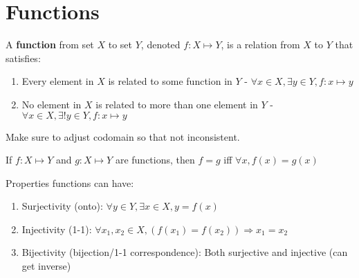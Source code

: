 \documentclass[12pt]{article}
\begin{document}
\section*{Functions}

A \textbf{function} from set $X$ to set $Y$, denoted $f\colon X \mapsto Y$, is a relation from $X$ to $Y$ that satisfies:
\begin{enumerate}
    \item Every element in $X$ is related to some function in $Y$ - $\forall x \in X, \exists y \in Y, f\colon x \mapsto y$
    \item No element in $X$ is related to more than one element in $Y$ - $\forall x \in X, \exists! y \in Y, f\colon x \mapsto y$
\end{enumerate}

Make sure to adjust codomain so that not inconsistent.

If $f\colon X \mapsto Y$ and $g\colon X \mapsto Y$ are functions, then $f=g$ iff $\forall x, f(x) = g(x)$

Properties functions can have:
\begin{enumerate}
    \item Surjectivity (onto): $\forall y \in Y, \exists x \in X, y = f(x)$
    \item Injectivity (1-1): $\forall x_1, x_2 \in X, (f(x_1) = f(x_2)) \Rightarrow x_1 = x_2$
    \item Bijectivity (bijection/1-1 correspondence): Both surjective and injective (can get inverse)
\end{enumerate}
\end{document}
